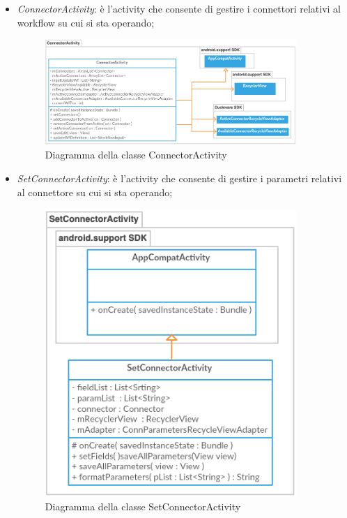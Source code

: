\begin{itemize}
   
   
    \item \emph{ConnectorActivity}: è l'activity che consente di gestire i connettori relativi al workflow su cui si sta operando;
        \begin{figure}[H]
	    \begin{center}
		\includegraphics[width=0.9\textwidth, keepaspectratio]{../includes/pics/connectoractivity.png}
		\caption{Diagramma della classe ConnectorActivity}
	    \end{center}
        \end{figure}
    
    
     \item \emph{SetConnectorActivity}: è l'activity che consente di gestire i parametri relativi al connettore su cui si sta operando;
        \begin{figure}[H]
	    \begin{center}
		\includegraphics[width=0.9\textwidth, keepaspectratio]{../includes/pics/setconnectoractivity.png}
		\caption{Diagramma della classe SetConnectorActivity}
	    \end{center}
        \end{figure}   
\end{itemize}

